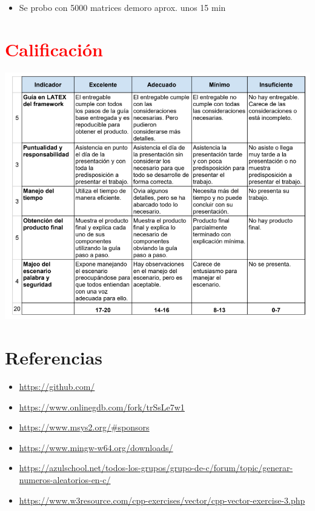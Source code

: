 \documentclass{article}
\begin{document}
	\begin{itemize}	
		\item Se probo con 5000 matrices demoro aprox. unos 15 min

	\end{itemize}






		

\section{\textcolor{red}{Calificación}}

\includegraphics[width=1\textwidth]{img/calificacion.png}

	
\clearpage

\section{Referencias}
\begin{itemize}			
	\item \url{https://github.com/}
	\item \url{https://www.onlinegdb.com/fork/trSsLe7w1}
 	\item \url{https://www.msys2.org/#sponsors}
  	\item \url{https://www.mingw-w64.org/downloads/}
   	\item \url{https://azulschool.net/todos-los-grupos/grupo-de-c/forum/topic/generar-numeros-aleatorios-en-c/}
	\item \url{https://www.w3resource.com/cpp-exercises/vector/cpp-vector-exercise-3.php}



    
\end{itemize}	
	
%
%
%
\end{document}
